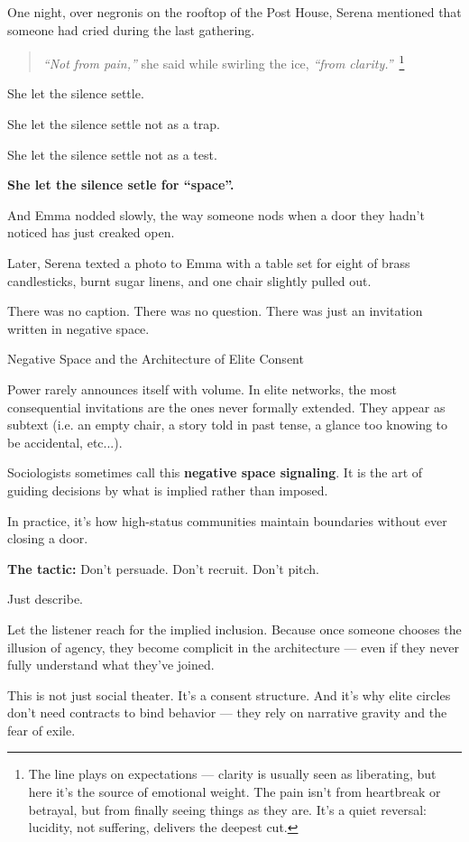 One night, over negronis on the rooftop of the Post House, Serena mentioned that someone had cried during the 
last gathering.  

\begin{quote}
\textit{“Not from pain,”} she said while swirling the ice, \textit{“from clarity.”}\ \footnote{The line plays on 
expectations — clarity is usually seen as liberating, but here it’s the source of emotional weight. The pain 
isn't from heartbreak or betrayal, but from finally seeing things as they are. It's a quiet reversal: lucidity, 
not suffering, delivers the deepest cut.}
\end{quote}

She let the silence settle. 

She let the silence settle not as a trap.  

She let the silence settle not as a test. 

\textbf{She let the silence setle for ``space''.} 

And Emma nodded slowly, the way someone nods when a door they hadn’t noticed has just creaked open.

Later, Serena texted a photo to Emma with a table set for eight of 
brass candlesticks, burnt sugar linens, and one chair slightly pulled out.

There was no caption.  
There was no question.  
There was just an invitation written in negative space.

\medskip

\begin{PsychologicalSidebar}{Negative Space and the Architecture of Elite Consent}

Power rarely announces itself with volume.  
In elite networks, the most consequential invitations are the ones never formally extended.  
They appear as subtext (i.e. an empty chair, a story told in past tense, a glance too knowing 
to be accidental, etc...).

\medskip

Sociologists sometimes call this \textbf{negative space signaling}. It is the art of guiding 
decisions by what is implied rather than imposed.  

\medskip

In practice, it's how high-status communities maintain boundaries without ever closing a door.  

\medskip

\textbf{The tactic:}  Don’t persuade. Don’t recruit. Don’t pitch.

\medskip

Just describe.

\medskip

Let the listener reach for the implied inclusion.  
Because once someone chooses the illusion of agency, they become complicit in the architecture — even if 
they never fully understand what they’ve joined.

\medskip

This is not just social theater.  
It’s a consent structure.  
And it’s why elite circles don’t need contracts to bind behavior — they rely on narrative gravity and the fear of exile.

\end{PsychologicalSidebar}

